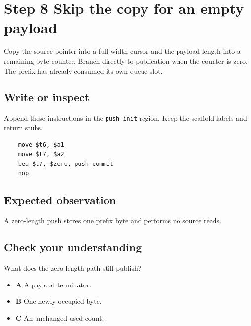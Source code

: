 \section{Step 8 Skip the copy for an empty payload}\label{ring-s08}

Copy the source pointer into a full-width cursor and the payload length into a remaining-byte counter. Branch directly to publication when the counter is zero. The prefix has already consumed its own queue slot.

\subsection{Write or inspect}
Append these instructions in the \texttt{push\_init} region. Keep the scaffold labels and return stubs.

\begin{verbatim}
    move $t6, $a1
    move $t7, $a2
    beq $t7, $zero, push_commit
    nop
\end{verbatim}

\subsection{Expected observation}
A zero-length push stores one prefix byte and performs no source reads.

\subsection{Check your understanding}
What does the zero-length path still publish?

\begin{itemize}
  \item \textbf{A} A payload terminator.
  \item \textbf{B} One newly occupied byte.
  \item \textbf{C} An unchanged used count.
\end{itemize}
